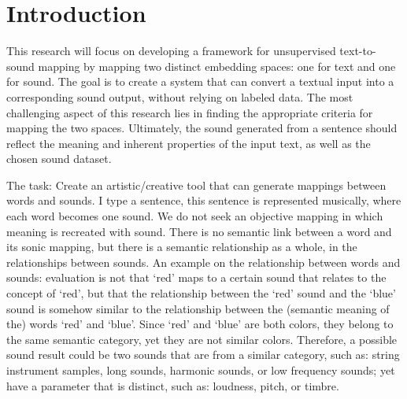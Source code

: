 \documentclass[twoside,a4paper]{article}
\title{\papertitle}
\newif\ifpdf
\begin{document}
\ifpdf %
  \DeclareGraphicsExtensions{.png,.jpg,.pdf}
\else  %
\fi


\maketitle

\begin{abstract}
This research focuses on developing a framework for unsupervised text-to-sound mapping by aligning two distinct embedding spaces: one for text and one for sound. The goal is to create a system that converts textual input into corresponding sound output without relying on labeled data. This paper presents the methodology, experiments, and results of this novel approach, along with its artistic implications.
\end{abstract}

\section{Introduction}
This research will focus on developing a framework for unsupervised text-to-sound mapping by mapping two distinct embedding spaces: one for text and one for sound. The goal is to create a system that can convert a textual input into a corresponding sound output, without relying on labeled data. The most challenging aspect of this research lies in finding the appropriate criteria for mapping the two spaces. Ultimately, the sound generated from a sentence should reflect the meaning and inherent properties of the input text, as well as the chosen sound dataset.

The task: Create an artistic/creative tool that can generate mappings between words and sounds. I type a sentence, this sentence is represented musically, where each word becomes one sound. We do not seek an objective mapping in which meaning is recreated with sound. There is no semantic link between a word and its sonic mapping, but there is a semantic relationship as a whole, in the relationships between sounds. An example on the relationship between words and sounds: evaluation is not that ‘red’ maps to a certain sound that relates to the concept of ‘red’, but that the relationship between the ‘red’ sound and the ‘blue’ sound is somehow similar to the relationship between the (semantic meaning of the) words ‘red’ and ‘blue’. Since ‘red’ and ‘blue’ are both colors, they belong to the same semantic category, yet they are not similar colors. Therefore, a possible sound result could be two sounds that are from a similar category, such as: string instrument samples, long sounds, harmonic sounds, or low frequency sounds; yet have a parameter that is distinct, such as: loudness, pitch, or timbre.
\end{document}
